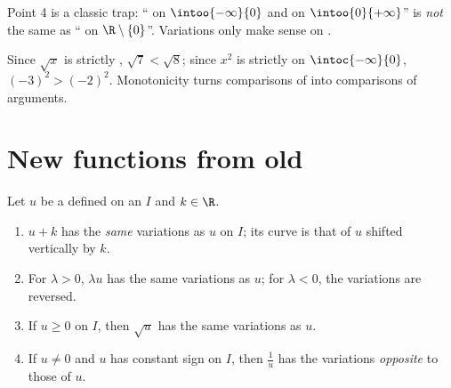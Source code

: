 \begin{remark}
Point 4 is a classic trap: `` on $\intoo{-\infty}{0}$ and on
$\intoo{0}{+\infty}$'' is \emph{not} the same as `` on
$\R \setminus \{0\}$''. Variations only make sense on .
\end{remark}

\begin{example}
Since $\sqrt x$ is strictly , $\sqrt{7} < \sqrt{8}$; since
$x^2$ is strictly  on $\intoc{-\infty}{0}$,
$(-3)^2 > (-2)^2$. Monotonicity turns comparisons of  into
comparisons of arguments.
\end{example}

\section{New functions from old}

\begin{proposition}[Transformations]\label{prop:g11:func:transforms}
Let $u$ be a  defined on an  $I$ and $k \in \R$.
\begin{enumerate}
  \item $u + k$ has the \emph{same} variations as $u$ on $I$; its curve is
        that of $u$ shifted vertically by $k$.
  \item For $\lambda > 0$, $\lambda u$ has the same variations as $u$; for
        $\lambda < 0$, the variations are reversed.
  \item If $u \geq 0$ on $I$, then $\sqrt u$ has the same variations as
        $u$.
  \item If $u \neq 0$ and $u$ has constant sign on $I$, then $\frac1u$ has
        the variations \emph{opposite} to those of $u$.
\end{enumerate}
\end{proposition}

